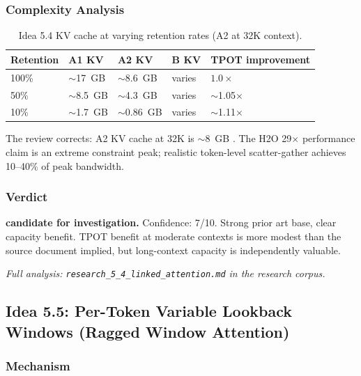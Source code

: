 \documentclass[11pt]{article}
\begin{document}
\subsubsection*{Complexity Analysis}

\begin{table}[h]
\centering
\caption{Idea 5.4 KV cache at varying retention rates (A2 at 32K context).}
\small
\begin{tabular}{lllll}
\toprule
Retention & A1 KV & A2 KV & B KV & TPOT improvement \\
\midrule
100\% & $\sim$17~GB & $\sim$8.6~GB & varies & $1.0\times$ \\
50\% & $\sim$8.5~GB & $\sim$4.3~GB & varies & $\sim$1.05$\times$ \\
10\% & $\sim$1.7~GB & $\sim$0.86~GB & varies & $\sim$1.11$\times$ \\
\bottomrule
\end{tabular}
\end{table}

The review corrects: A2 KV cache at 32K is $\sim$8~GB . The H2O 29$\times$ performance claim is an extreme constraint peak; realistic token-level scatter-gather achieves 10--40\% of peak bandwidth.

\subsubsection*{Verdict}

\noindent\textbf{candidate for investigation.} Confidence: 7/10. Strong prior art base, clear capacity benefit. TPOT benefit at moderate contexts is more modest than the source document implied, but long-context capacity is independently valuable.

\par\noindent\textit{Full analysis: \texttt{research\_5\_4\_linked\_attention.md} in the research corpus.}


\subsection{Idea 5.5: Per-Token Variable Lookback Windows (Ragged Window Attention)}
\label{subsec:idea55}

\subsubsection*{Mechanism}
\end{document}
